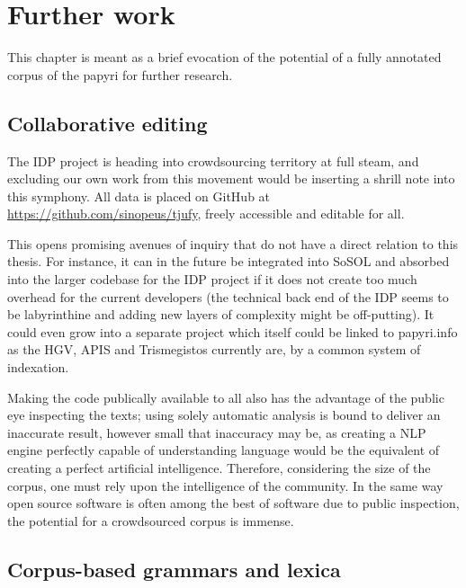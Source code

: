 
\chapter{Further work} %
\label{cha:further_work}

This chapter is meant as a brief evocation of the potential of a fully
annotated corpus of the papyri for further research.

\section{Collaborative editing}
\label{sec:collaborativeediting}

The IDP project is heading into crowdsourcing territory at full steam, and
excluding our own work from this movement would be inserting a shrill note into
this symphony. All data is placed on GitHub at
\url{https://github.com/sinopeus/tjufy}, freely accessible and editable for
all. 

This opens promising avenues of inquiry that do not have a direct relation
to this thesis. For instance, it can in the future be integrated into SoSOL and
absorbed into the larger codebase for the IDP project if it does not create too
much overhead for the current developers (the technical back end of the IDP
seems to be labyrinthine and adding new layers of complexity might be
off-putting). It could even grow into a separate project which itself could be
linked to papyri.info as the HGV, APIS and Trismegistos currently are, by a
common system of indexation.

Making the code publically available to all also has the advantage of the
public eye inspecting the texts; using solely automatic analysis is bound to
deliver an inaccurate result, however small that inaccuracy may be, as creating
a NLP engine perfectly capable of understanding language would be the
equivalent of creating a perfect artificial intelligence. Therefore,
considering the size of the corpus, one must rely upon the intelligence of the
community. In the same way open source software is often among the best of software due to public inspection, the potential for a crowdsourced corpus is
immense.

\section{Corpus-based grammars and lexica}
\label{sec:corpusbasedgrammars}


